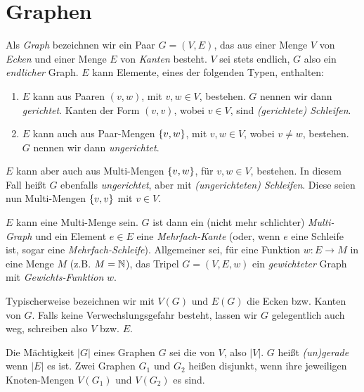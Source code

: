     \section{Graphen}

        \begin{definition} \label{def:graph}

            Als \textit{Graph} bezeichnen wir ein Paar $G = (V, E)$, das aus einer Menge $V$ von \textit{Ecken} und einer Menge $E$ von \textit{Kanten} besteht.
            $V$ sei stets endlich, $G$ also ein \textit{endlicher} Graph.
            $E$ kann Elemente, eines der folgenden Typen, enthalten:

            \begin{enumerate}[label = \arabic*.]

                \item $E$ kann aus Paaren $(v, w)$, mit $v, w \in V$, bestehen.
                $G$ nennen wir dann \textit{gerichtet}.
                Kanten der Form $(v, v)$, wobei $v \in V$, sind \textit{(gerichtete) Schleifen}.

                \item $E$ kann auch aus Paar-Mengen ${\left \{ v, w \right \}}$, mit $v, w \in V$, wobei $v \neq w$, bestehen.
                $G$ nennen wir dann \textit{ungerichtet}.

            \end{enumerate}

            $E$ kann aber auch aus Multi-Mengen ${\left \{ v, w \right \}}$, für $v, w \in V$, bestehen.
            In diesem Fall heißt $G$ ebenfalls \textit{ungerichtet}, aber mit \textit{(ungerichteten) Schleifen}.
            Diese seien nun Multi-Mengen ${\left \{ v, v \right \}}$ mit $v \in V$.

            $E$ kann eine Multi-Menge sein.
            $G$ ist dann ein (nicht mehr schlichter) \textit{Multi-Graph} und ein Element $e \in E$ eine \textit{Mehrfach-Kante} (oder, wenn $e$ eine Schleife ist, sogar eine \textit{Mehrfach-Schleife}).
            Allgemeiner sei, für eine Funktion $w: E \to M$ in eine Menge $M$ (z.B. $M = \mathbb N$), das Tripel $G = (V, E, w)$ ein \textit{gewichteter} Graph mit \textit{Gewichts-Funktion} $w$.

            Typischerweise bezeichnen wir mit $V(G)$ und $E(G)$ die Ecken bzw. Kanten von $G$.
            Falls keine Verwechslungsgefahr besteht, lassen wir $G$ gelegentlich auch weg, schreiben also $V$ bzw. $E$.

            Die Mächtigkeit $|G|$ eines Graphen $G$ sei die von $V$, also $|V|$.
            $G$ heißt \textit{(un)gerade} wenn $|E|$ es ist.
            Zwei Graphen $G_1$ und $G_2$ heißen disjunkt, wenn ihre jeweiligen Knoten-Mengen $V(G_1)$ und $V(G_2)$ es sind.

        \end{definition}

